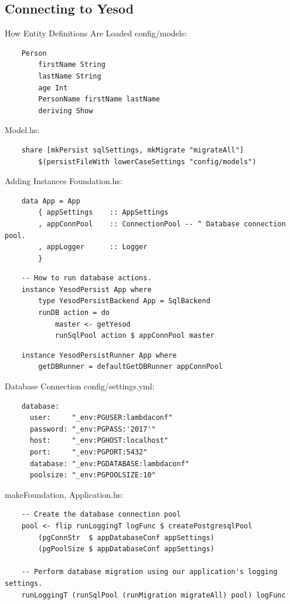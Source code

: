 \documentclass[pdf]{beamer}
\begin{document}
\subsection{Connecting to Yesod}
\begin{frame}[fragile]{How Entity Definitions Are Loaded}
  config/models:
  \begin{verbatim}
    Person
        firstName String
        lastName String
        age Int
        PersonName firstName lastName
        deriving Show
  \end{verbatim}
  Model.hs:
  \begin{verbatim}
    share [mkPersist sqlSettings, mkMigrate "migrateAll"]
        $(persistFileWith lowerCaseSettings "config/models")
  \end{verbatim}
\end{frame}

\begin{frame}[fragile]{Adding Instances}
  Foundation.hs:
  \begin{verbatim}
    data App = App
        { appSettings    :: AppSettings
        , appConnPool    :: ConnectionPool -- ^ Database connection pool.
        , appLogger      :: Logger
        }
  \end{verbatim}
  \pause
  \begin{verbatim}
    -- How to run database actions.
    instance YesodPersist App where
        type YesodPersistBackend App = SqlBackend
        runDB action = do
            master <- getYesod
            runSqlPool action $ appConnPool master
  \end{verbatim}
  \pause
  \begin{verbatim}
    instance YesodPersistRunner App where
        getDBRunner = defaultGetDBRunner appConnPool
  \end{verbatim}
\end{frame}

\begin{frame}[fragile]{Database Connection}
  config/settings.yml:
  \begin{verbatim}
    database:
      user:     "_env:PGUSER:lambdaconf"
      password: "_env:PGPASS:'2017'"
      host:     "_env:PGHOST:localhost"
      port:     "_env:PGPORT:5432"
      database: "_env:PGDATABASE:lambdaconf"
      poolsize: "_env:PGPOOLSIZE:10"
  \end{verbatim}
  makeFoundation, Application.hs:
  \begin{verbatim}
    -- Create the database connection pool
    pool <- flip runLoggingT logFunc $ createPostgresqlPool
        (pgConnStr  $ appDatabaseConf appSettings)
        (pgPoolSize $ appDatabaseConf appSettings)

    -- Perform database migration using our application's logging settings.
    runLoggingT (runSqlPool (runMigration migrateAll) pool) logFunc
  \end{verbatim}
\end{frame}
\end{document}
